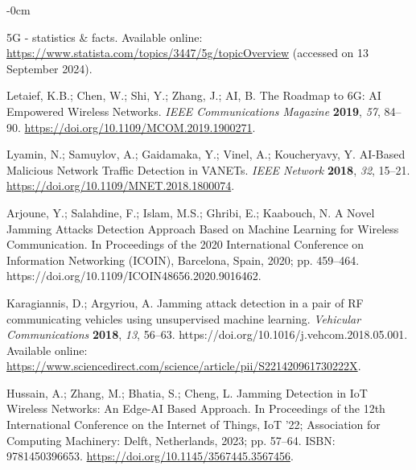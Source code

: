 \documentclass[futureinternet,article,submit,pdftex,moreauthors]{Definitions/mdpi}
\begin{document}
\begin{adjustwidth}{-\extralength}{0cm}


\begin{thebibliography}{999}

5G - statistics \& facts. Available online: \url{https://www.statista.com/topics/3447/5g/topicOverview} (accessed on 13 September 2024).

Letaief, K.B.; Chen, W.; Shi, Y.; Zhang, J.; AI, B. The Roadmap to 6G: AI Empowered Wireless Networks. {\em IEEE Communications Magazine} {\bf 2019}, {\em 57}, 84--90. \url{https://doi.org/10.1109/MCOM.2019.1900271}.

Lyamin, N.; Samuylov, A.; Gaidamaka, Y.; Vinel, A.; Koucheryavy, Y. AI-Based Malicious Network Traffic Detection in VANETs. {\em IEEE Network} {\bf 2018}, {\em 32}, 15--21. \url{https://doi.org/10.1109/MNET.2018.1800074}.

Arjoune, Y.; Salahdine, F.; Islam, M.S.; Ghribi, E.; Kaabouch, N. A Novel Jamming Attacks Detection Approach Based on Machine Learning for Wireless Communication. In Proceedings of the 2020 International Conference on Information Networking (ICOIN), Barcelona, Spain, 2020; pp. 459--464. https://doi.org/10.1109/ICOIN48656.2020.9016462.

Karagiannis, D.; Argyriou, A. Jamming attack detection in a pair of RF communicating vehicles using unsupervised machine learning. {\em Vehicular Communications} {\bf 2018}, {\em 13}, 56--63. https://doi.org/10.1016/j.vehcom.2018.05.001. Available online: \url{https://www.sciencedirect.com/science/article/pii/S221420961730222X}.

Hussain, A.; Zhang, M.; Bhatia, S.; Cheng, L. Jamming Detection in IoT Wireless Networks: An Edge-AI Based Approach. In Proceedings of the 12th International Conference on the Internet of Things, IoT ’22; Association for Computing Machinery: Delft, Netherlands, 2023; pp. 57--64. ISBN: 9781450396653. \url{https://doi.org/10.1145/3567445.3567456}.


\end{thebibliography}
\end{adjustwidth}
\end{document}
